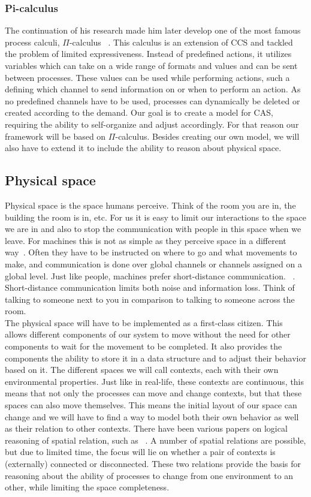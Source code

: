 \subsubsection{Pi-calculus}
The continuation of his research made him later develop one of the most famous process calculi, $\Pi$-calculus ~\cite{milner1993polyadic}. This calculus is an extension of CCS and tackled the problem of limited expressiveness. Instead of predefined actions, it utilizes variables which can take on a wide range of formats and values and can be sent between processes. These values can be used while performing actions, such a defining which channel to send information on or when to perform an action. As no predefined channels have to be used, processes can dynamically be deleted or created according to the demand. Our goal is to create a model for CAS, requiring the ability to self-organize and adjust accordingly. For that reason our framework will be based on $\Pi$-calculus. Besides creating our own model, we will also have to extend it to include the ability to reason about physical space. 
\\
\subsection{Physical space}
Physical space is the space humans perceive. Think of the room you are in, the building the room is in, etc. For us it is easy to limit our interactions to the space we are in and also to stop the communication with people in this space when we leave. For machines this is not as simple as they perceive space in a different way~\cite{bay1999fundamentals}. Often they have to be instructed on where to go and what movements to make, and communication is done over global channels or channels assigned on a global level. Just like people, machines prefer short-distance communication. ~\cite{yin2021convergence}. Short-distance communication limits both noise and information loss. Think of talking to someone next to you in comparison to talking to someone across the room. 
\\
The physical space will have to be implemented as a first-class citizen. This allows different components of our system to move without the need for other components to wait for the movement to be completed. It also provides the components the ability to store it in a data structure and to adjust their behavior based on it. The different spaces we will call contexts, each with their own environmental properties. Just like in real-life, these contexts are continuous, this means that not only the processes can move and change contexts, but that these spaces can also move themselves. This means the initial layout of our space can change and we will have to find a way to model both their own behavior as well as their relation to other contexts. There have been various papers on logical reasoning of spatial relation, such as ~\cite{randell1992spatial}. A number of spatial relations are possible, but due to limited time, the focus will lie on whether a pair of contexts is (externally) connected or disconnected. These two relations provide the basis for reasoning about the ability of processes to change from one environment to an other, while limiting the space completeness. 
\\

